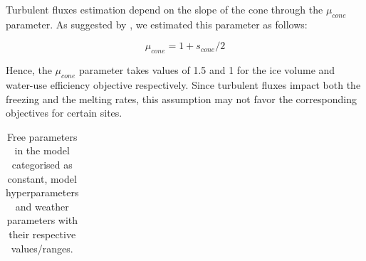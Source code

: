 \documentclass[tc, manuscript]{copernicus}
\begin{document}
Turbulent fluxes estimation depend on the slope of the cone through the $\mu_{cone}$ parameter. As suggested 
by \citet{oerlemansBriefCommunicationGrowth2021}, we estimated this parameter as follows:

\begin{equation}
  \mu_{cone} =1 + s_{cone}/2
\end{equation}

Hence, the $\mu_{cone}$ parameter takes values of 1.5 and 1 for the ice volume and water-use efficiency
objective respectively.  Since turbulent fluxes impact both the freezing and the melting rates, this assumption
may not favor the corresponding objectives for certain sites.

\appendixtables   %

\begin{table}
  \caption{Free parameters in the model categorised as constant, model hyperparameters and weather 
  parameters with their respective values/ranges.}

	\label{tab:parameters}
	\begin{tabular}{lllll}
		\toprule


\end{tabular}
\end{table}
\end{document}
